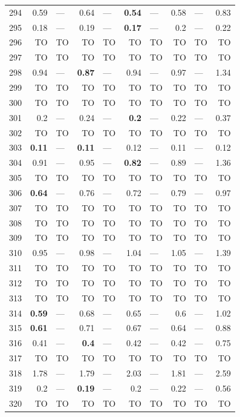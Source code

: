 \begin{longtable}{lr@{\hskip 4pt}l@{\hskip 12pt}r@{\hskip 4pt}l@{\hskip 12pt}r@{\hskip 4pt}l@{\hskip 12pt}r@{\hskip 4pt}l@{\hskip 12pt}r}
294 & 0.59 & --- & 0.64 & --- & \textbf{0.54} & --- & 0.58 & --- & 0.83 \\
295 & 0.18 & --- & 0.19 & --- & \textbf{0.17} & --- & 0.2 & --- & 0.22 \\
296 & TO & TO & TO & TO & TO & TO & TO & TO & TO \\
297 & TO & TO & TO & TO & TO & TO & TO & TO & TO \\
298 & 0.94 & --- & \textbf{0.87} & --- & 0.94 & --- & 0.97 & --- & 1.34 \\
299 & TO & TO & TO & TO & TO & TO & TO & TO & TO \\
300 & TO & TO & TO & TO & TO & TO & TO & TO & TO \\
301 & 0.2 & --- & 0.24 & --- & \textbf{0.2} & --- & 0.22 & --- & 0.37 \\
302 & TO & TO & TO & TO & TO & TO & TO & TO & TO \\
303 & \textbf{0.11} & --- & \textbf{0.11} & --- & 0.12 & --- & 0.11 & --- & 0.12 \\
304 & 0.91 & --- & 0.95 & --- & \textbf{0.82} & --- & 0.89 & --- & 1.36 \\
305 & TO & TO & TO & TO & TO & TO & TO & TO & TO \\
306 & \textbf{0.64} & --- & 0.76 & --- & 0.72 & --- & 0.79 & --- & 0.97 \\
307 & TO & TO & TO & TO & TO & TO & TO & TO & TO \\
308 & TO & TO & TO & TO & TO & TO & TO & TO & TO \\
309 & TO & TO & TO & TO & TO & TO & TO & TO & TO \\
310 & 0.95 & --- & 0.98 & --- & 1.04 & --- & 1.05 & --- & 1.39 \\
311 & TO & TO & TO & TO & TO & TO & TO & TO & TO \\
312 & TO & TO & TO & TO & TO & TO & TO & TO & TO \\
313 & TO & TO & TO & TO & TO & TO & TO & TO & TO \\
314 & \textbf{0.59} & --- & 0.68 & --- & 0.65 & --- & 0.6 & --- & 1.02 \\
315 & \textbf{0.61} & --- & 0.71 & --- & 0.67 & --- & 0.64 & --- & 0.88 \\
316 & 0.41 & --- & \textbf{0.4} & --- & 0.42 & --- & 0.42 & --- & 0.75 \\
317 & TO & TO & TO & TO & TO & TO & TO & TO & TO \\
318 & 1.78 & --- & 1.79 & --- & 2.03 & --- & 1.81 & --- & 2.59 \\
319 & 0.2 & --- & \textbf{0.19} & --- & 0.2 & --- & 0.22 & --- & 0.56 \\
320 & TO & TO & TO & TO & TO & TO & TO & TO & TO \\
\bottomrule
\end{longtable}